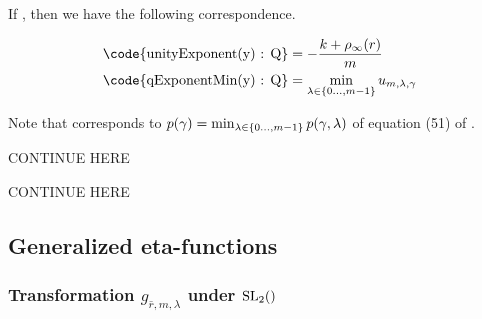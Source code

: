 \documentclass{article}
\begin{document}
If , then we have the
following correspondence.

\begin{align*}
  \text{\code{unityExponent(y) : Q}}
  &=
    -\frac{k + \rho_\infty(r)}{m}
  \\
  \text{\code{qExponentMin(y) : Q}}
  &=
    \min_{\lambda \in \Set{0\ldots,m-1}} u_{m,\lambda,\gamma}
\end{align*}


Note that  corresponds to
$p(\gamma)=\min_{\lambda \in \left\{0\ldots,m-1\right\}}p(\gamma,\lambda)$ of
equation (51) of
\cite{Radu_AlgorithmicApproachRamanujanCongruences_2009}.


\begin{Hemmecke}
  CONTINUE HERE
\end{Hemmecke}
\begin{Hemmecke}
  CONTINUE HERE
\end{Hemmecke}








\subsection{Generalized eta-functions}




\subsubsection{Transformation $g_{\bar{r},m,\lambda}$ under $\SL2Z$}
\end{document}
